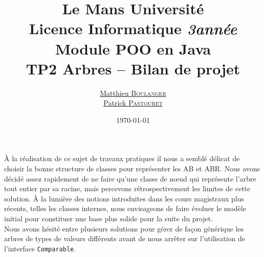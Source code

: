 \documentclass[a4paper,11pt]{article}
\title {\textbf {\color {blue} Le Mans Université}\color{black}
\\  Licence Informatique  \textit {3\ieme année}
 \\Module POO en Java
 \\ \textbf {TP2 Arbres -- Bilan de projet}}
\author{\href{mailto: matthieu.boulanger.etu@univ-lemans.fr} {Matthieu \textsc{Boulanger}}\\
      \href{mailto: patrick.pastouret.etu@univ-lemans.fr} {Patrick \textsc{Pastouret}}}
\date{\today}
\begin{document}
\maketitle

À la réalisation de ce sujet de travaux pratiques il nous a semblé délicat de choisir la bonne structure de classes pour représenter les AB et ABR. Nous avons décidé assez rapidement de ne faire qu'une classe de n\oe ud qui représente l'arbre tout entier par sa racine, mais percevons rétrospectivement les limites de cette solution. À la lumière des notions introduites dans les cours magistraux plus récents, telles les classes internes, nous envisageons de faire évoluer le modèle initial pour constituer une base plus solide pour la suite du projet.\\
Nous avons hésité entre plusieurs solutions pour gérer de façon générique les arbres de types de valeurs différents avant de nous arrêter sur l'utilisation de l'interface \texttt{Comparable}.
\end{document}
